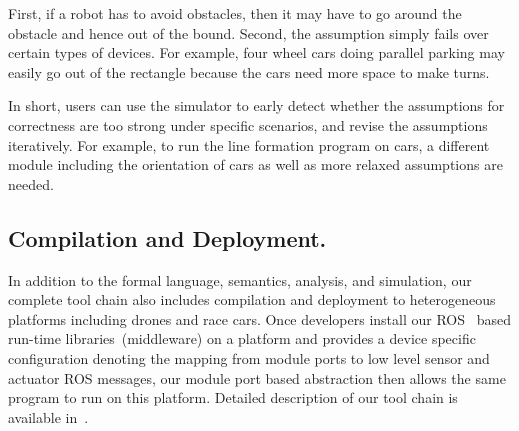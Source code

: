 First, if a robot has to avoid obstacles,
then it may have to go around the obstacle and hence out of the bound.
Second, the assumption simply fails over certain types of devices.
For example, four wheel cars doing parallel parking may easily go out of the rectangle
because the cars need more space to make turns.

In short, users can use the simulator to early detect whether
the assumptions for correctness are too strong under specific scenarios,
and revise the assumptions iteratively.
For example, to run the line formation program on cars,
a different module including the orientation of cars as well as more relaxed assumptions are needed.

\subsection{Compilation and Deployment.}
In addition to the formal language, semantics, analysis, and simulation,
our complete tool chain also includes compilation and deployment to heterogeneous platforms including drones and race cars.
Once developers install our ROS~\cite{ros} based run-time libraries~(middleware) on a platform
and provides a device specific configuration denoting the mapping from \lgname module ports
to low level sensor and actuator ROS messages,
our module port based abstraction then allows the same \lgname program to run on this platform.
Detailed description of our tool chain is available in~\cite{ghosh2019cyphyhouse}.
